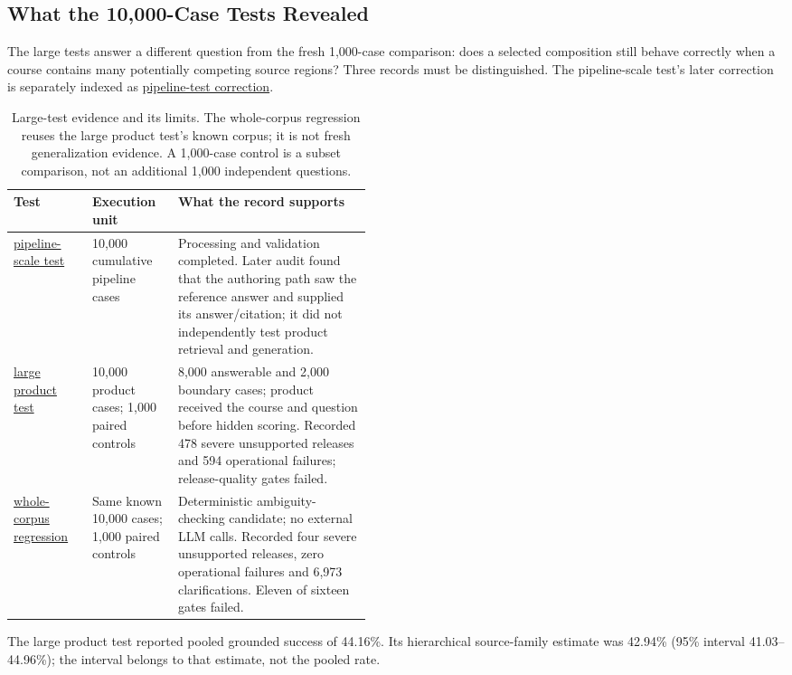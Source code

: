 \subsection{What the 10,000-Case Tests Revealed}
\label{sec:large-regression}
The large tests answer a different question from the fresh 1,000-case comparison:
does a selected composition still behave correctly when a course contains many
potentially competing source regions? Three records must be distinguished. The pipeline-scale test's later correction is separately
indexed as \hyperref[study-L1c]{pipeline-test correction}.

\begin{table}[htbp]
\centering\small
\caption{Large-test evidence and its limits. The whole-corpus regression reuses the large product test's known corpus; it is
not fresh generalization evidence. A 1,000-case control is a subset comparison,
not an additional 1,000 independent questions.}
\label{tab:large-tests}
\begin{tabularx}{\linewidth}{@{}L{0.22\linewidth}L{0.24\linewidth}Y@{}}
\toprule Test & Execution unit & What the record supports \\ \midrule
\hyperref[study-L1]{pipeline-scale test} & 10,000 cumulative pipeline cases & Processing and validation completed. Later audit found that the authoring path saw the reference answer and supplied its answer/citation; it did not independently test product retrieval and generation. \\
\hyperref[study-L2]{large product test} & 10,000 product cases; 1,000 paired controls & 8,000 answerable and 2,000 boundary cases; product received the course and question before hidden scoring. Recorded 478 severe unsupported releases and 594 operational failures; release-quality gates failed. \\
\hyperref[study-L3]{whole-corpus regression} & Same known 10,000 cases; 1,000 paired controls & Deterministic ambiguity-checking candidate; no external LLM calls. Recorded four severe unsupported releases, zero operational failures and 6,973 clarifications. Eleven of sixteen gates failed. \\
\bottomrule
\end{tabularx}
\end{table}

The large product test reported pooled grounded success of 44.16\%. Its
hierarchical source-family estimate was 42.94\% (95\% interval
41.03--44.96\%); the interval belongs to that estimate, not the pooled rate.

